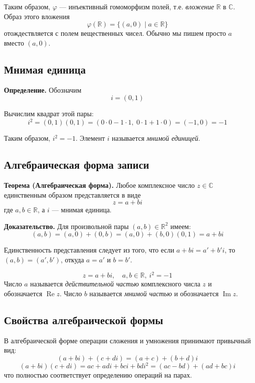 \documentclass[a4paper,12pt]{article}
\theoremstyle{definition}
\theoremstyle{plain}
\theoremstyle{remark}
\begin{document}
	Таким образом, $\varphi$ — инъективный гомоморфизм полей, т.е. \textit{вложение} $\mathbb{R}$ в $\mathbb{C}$. Образ этого вложения
	\[
	\varphi(\mathbb{R}) = \{(a, 0) \mid a \in \mathbb{R}\}
	\]
	отождествляется с полем вещественных чисел. Обычно мы пишем просто $a$ вместо $(a,0)$.
	
	\subsection{Мнимая единица}
	
	\noindent \textbf{Определение.} Обозначим
	\[
	i = (0, 1)
	\]
	
	Вычислим квадрат этой пары:
	\[
	i^2 = (0, 1)(0, 1) = (0 \cdot 0 - 1 \cdot 1,\; 0 \cdot 1 + 1 \cdot 0) = (-1, 0) = -1
	\]
	
	Таким образом, $i^2 = -1$. Элемент $i$ называется \textit{мнимой единицей}.
	
	\subsection{Алгебраическая форма записи}
	
	\noindent \textbf{Теорема (Алгебраическая форма).}
	Любое комплексное число $z \in \mathbb{C}$ единственным образом представляется в виде
	\[
	z = a + bi
	\]
	где $a, b \in \mathbb{R}$, а $i$ — мнимая единица.
	
	\medskip
	\noindent \textbf{Доказательство.}
	Для произвольной пары $(a, b) \in \mathbb{R}^2$ имеем:
	\[
	(a, b) = (a, 0) + (0, b) = (a, 0) + (b, 0)(0, 1) = a + bi
	\]
	
	Единственность представления следует из того, что если $a + bi = a' + b'i$, то $(a, b) = (a', b')$, откуда $a = a'$ и $b = b'$.
	
	\begin{tcolorbox}[colback=red!5, colframe=red!70!black, title=Алгебраическая форма]
		\[
		\boxed{z = a + bi,\quad a,b \in \mathbb{R},\ i^2 = -1}
		\]
		Число $a$ называется \textit{действительной частью} комплексного числа $z$ и обозначается $\operatorname{Re} z$. Число $b$ называется \textit{мнимой частью} и обозначается $\operatorname{Im} z$.
	\end{tcolorbox}
	
	\subsection{Свойства алгебраической формы}
	
	В алгебраической форме операции сложения и умножения принимают привычный вид:
	\[
	(a + bi) + (c + di) = (a + c) + (b + d)i
	\]
	\[
	(a + bi)(c + di) = ac + adi + bci + bdi^2 = (ac - bd) + (ad + bc)i
	\]
	что полностью соответствует определению операций на парах.
	
\end{document}
